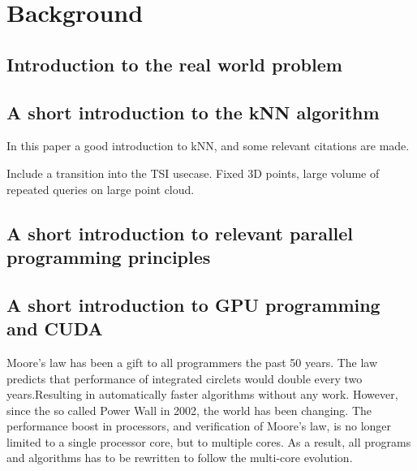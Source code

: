 \section{Background}

\subsection{Introduction to the real world problem} %
\label{sub:introduction_to_the_real_world_problem}


\subsection{A short introduction to the kNN algorithm} %
\label{a_short_introduction_to_the_kNN_algorithm}

\cite{Garcia2010} In this paper a good introduction to kNN, and some relevant citations are made.

Include a transition into the TSI usecase. Fixed 3D points, large volume of repeated queries on large point cloud.



\subsection{A short introduction to relevant parallel programming principles} %
\label{sub:a_short_introduction_to_relevant_parallel_programming_principles}


\subsection{A short introduction to GPU programming and CUDA} %
\label{sub:a_short_introduction_to_gpu_programming_and_cuda}

Moore's law has been a gift to all programmers the past 50 years. The law predicts that performance of integrated circlets would double every two years.Resulting in automatically faster algorithms without any work. However, since the so called Power Wall in 2002, the world has been changing. The performance boost  in processors, and verification of Moore's law, is no longer limited to a single processor core, but to multiple cores. As a result, all programs and algorithms has to be rewritten to follow the multi-core evolution.



